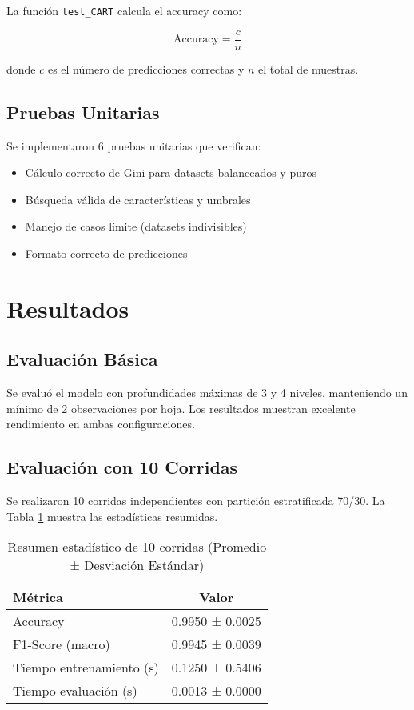 \documentclass[12pt,a4paper]{article}
\begin{document}
La función \texttt{test\_CART} calcula el accuracy como:

\begin{equation}
\text{Accuracy} = \frac{c}{n}
\end{equation}

donde $c$ es el número de predicciones correctas y $n$ el total de muestras.

\subsection{Pruebas Unitarias}

Se implementaron 6 pruebas unitarias que verifican:
\begin{itemize}
    \item Cálculo correcto de Gini para datasets balanceados y puros
    \item Búsqueda válida de características y umbrales
    \item Manejo de casos límite (datasets indivisibles)
    \item Formato correcto de predicciones
\end{itemize}

\section{Resultados}

\subsection{Evaluación Básica}

Se evaluó el modelo con profundidades máximas de 3 y 4 niveles, manteniendo un mínimo de 2 observaciones por hoja. Los resultados muestran excelente rendimiento en ambas configuraciones.

\subsection{Evaluación con 10 Corridas}

Se realizaron 10 corridas independientes con partición estratificada 70/30. La Tabla \ref{tab:evaluacion} muestra las estadísticas resumidas.

\begin{table}[H]
\centering
\caption{Resumen estadístico de 10 corridas (Promedio ± Desviación Estándar)}
\label{tab:evaluacion}
\begin{tabular}{lc}
\toprule
\textbf{Métrica} & \textbf{Valor} \\
\midrule
Accuracy & 0.9950 ± 0.0025 \\
F1-Score (macro) & 0.9945 ± 0.0039 \\
Tiempo entrenamiento (s) & 0.1250 ± 0.5406 \\
Tiempo evaluación (s) & 0.0013 ± 0.0000 \\
\bottomrule
\end{tabular}
\end{table}
\end{document}

